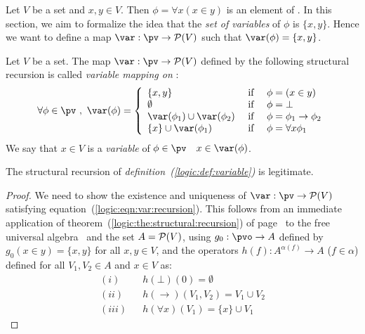 Let $V$ be a set and $x,y\in V$. Then $\phi=\forall x(x\in y)$ is an
element of \pv. In this section, we aim to formalize the idea that
the {\em set of variables} of $\phi$ is $\{x,y\}$. Hence we want to
define a map $\var:\pv\to{\cal P}(V)$ such that
$\var(\phi)=\{x,y\}$.
\begin{defin}\label{logic:def:variable}
Let $V$ be a set. The map $\var:\pv\to {\cal P}(V)$ defined by the
following structural recursion is called {\em variable mapping on \pv}:
\begin{equation}\label{logic:eqn:var:recursion}
    \forall\phi\in\pv\ ,\ \var(\phi)
    =
    \left\{\begin{array}{lcl}
        \{x,y\}&\mbox{\ if\ }&\phi=(x\in y)
        \\
        \emptyset&\mbox{\ if\ }&\phi=\bot
        \\
        \var(\phi_{1})\cup\var(\phi_{2}) &\mbox{\ if\ }&\phi=\phi_{1}\to\phi_{2}
        \\
        \{x\}\cup\var(\phi_{1})&\mbox{\ if\ }&\phi=\forall x\phi_{1}
    \end{array}\right.
\end{equation}
We say that $x\in V$ is a {\em variable} of $\phi\in\pv$ \ifand\ $x\in\var(\phi)$.
\end{defin}
\begin{prop}\label{logic:prop:variable}
    The structural recursion of {\em definition~(\ref{logic:def:variable})} 
    is legitimate.
\end{prop}
\begin{proof}
We need to show the existence and uniqueness of $\var:\pv\to{\cal
P}(V)$ satisfying equation~(\ref{logic:eqn:var:recursion}). This
follows from an immediate application of
theorem~(\ref{logic:the:structural:recursion}) of
page~\pageref{logic:the:structural:recursion} to the free universal
algebra \pv\ and the set $A={\cal P}(V)$, using $g_{0}:\pvo\to A$
defined by $g_{0}(x\in y)=\{x,y\}$ for all $x,y\in V$, and the
operators $h(f):A^{\alpha(f)}\to A$ ($f\in\alpha$) defined for all
$V_{1},V_{2}\in A$ and $x\in V$ as:
    \begin{eqnarray*}
        (i)&&h(\bot)(0)=\emptyset\\
        (ii)&&h(\to)(V_{1},V_{2})=V_{1}\cup V_{2}\\
        (iii)&&h(\forall x)(V_{1})=\{x\}\cup V_{1}
    \end{eqnarray*}
\end{proof}

